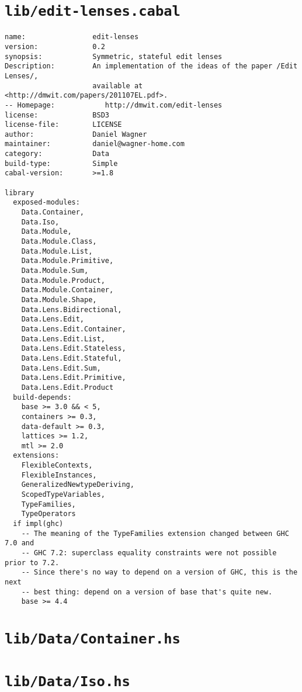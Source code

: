 \section{\texttt{lib/edit-lenses.cabal}}
\begin{verbatim}
name:                edit-lenses
version:             0.2
synopsis:            Symmetric, stateful edit lenses
Description:         An implementation of the ideas of the paper /Edit Lenses/,
                     available at <http://dmwit.com/papers/201107EL.pdf>.
-- Homepage:            http://dmwit.com/edit-lenses
license:             BSD3
license-file:        LICENSE
author:              Daniel Wagner
maintainer:          daniel@wagner-home.com
category:            Data
build-type:          Simple
cabal-version:       >=1.8

library
  exposed-modules:
    Data.Container,
    Data.Iso,
    Data.Module,
    Data.Module.Class,
    Data.Module.List,
    Data.Module.Primitive,
    Data.Module.Sum,
    Data.Module.Product,
    Data.Module.Container,
    Data.Module.Shape,
    Data.Lens.Bidirectional,
    Data.Lens.Edit,
    Data.Lens.Edit.Container,
    Data.Lens.Edit.List,
    Data.Lens.Edit.Stateless,
    Data.Lens.Edit.Stateful,
    Data.Lens.Edit.Sum,
    Data.Lens.Edit.Primitive,
    Data.Lens.Edit.Product
  build-depends:
    base >= 3.0 && < 5,
    containers >= 0.3,
    data-default >= 0.3,
    lattices >= 1.2,
    mtl >= 2.0
  extensions:
    FlexibleContexts,
    FlexibleInstances,
    GeneralizedNewtypeDeriving,
    ScopedTypeVariables,
    TypeFamilies,
    TypeOperators
  if impl(ghc)
    -- The meaning of the TypeFamilies extension changed between GHC 7.0 and
    -- GHC 7.2: superclass equality constraints were not possible prior to 7.2.
    -- Since there's no way to depend on a version of GHC, this is the next
    -- best thing: depend on a version of base that's quite new.
    base >= 4.4
\end{verbatim}

\section{\texttt{lib/Data/Container.hs}}
\label{mod:Data.Container}


\section{\texttt{lib/Data/Iso.hs}}
\label{mod:Data.Iso}


